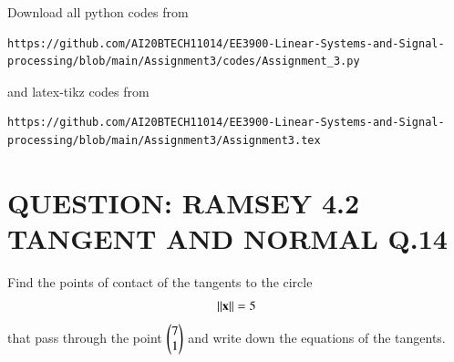 \documentclass[journal,12pt,twocolumn]{IEEEtran}
\begin{document}
\maketitle
\newpage
\bigskip
\renewcommand{\thefigure}{\theenumi}
\renewcommand{\thetable}{\theenumi}
Download all python codes from 
\begin{lstlisting}
https://github.com/AI20BTECH11014/EE3900-Linear-Systems-and-Signal-processing/blob/main/Assignment3/codes/Assignment_3.py
\end{lstlisting}
%
and latex-tikz codes from 
%
\begin{lstlisting}
https://github.com/AI20BTECH11014/EE3900-Linear-Systems-and-Signal-processing/blob/main/Assignment3/Assignment3.tex
\end{lstlisting}
\vspace{0.5cm}
\section{QUESTION: RAMSEY 4.2 TANGENT AND NORMAL Q.14}
 Find the points of contact of the tangents to
the circle
\begin{align}
\lVert\mathbf{x}\rVert=5 \label{eq:1}
\end{align}
that pass through the point $\begin{pmatrix}7 \\ 1\end{pmatrix}$ and write down the equations of the tangents.
\end{document}
